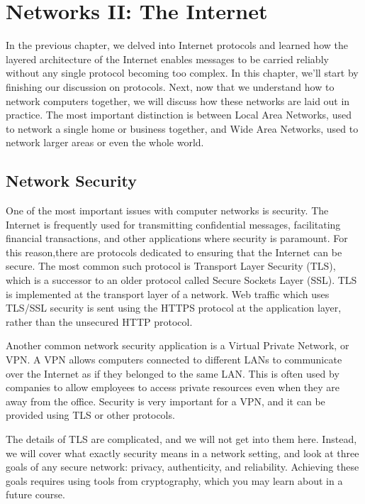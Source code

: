 \chapter{Networks II: The Internet}

In the previous chapter, we delved into Internet protocols and learned how the layered architecture of the Internet enables messages to be carried reliably without any single protocol becoming too complex. In this chapter, we'll start by finishing our discussion on protocols. Next, now that we understand how to network computers together, we will discuss how these networks are laid out in practice. The most important distinction is between Local Area Networks, used to network a single home or business together, and Wide Area Networks, used to network larger areas or even the whole world.


\section{Network Security}\label{sec:network:security}

One of the most important issues with computer networks is security. The Internet is frequently used for transmitting confidential messages, facilitating financial transactions, and other applications where security is paramount. For this reason,there are protocols dedicated to ensuring that the Internet can be secure. The most common such protocol is Transport Layer Security (TLS), which is a successor to an older protocol called Secure Sockets Layer (SSL). TLS is implemented at the transport layer of a network. Web traffic which uses TLS/SSL security is sent using the HTTPS protocol at the application layer, rather than the unsecured HTTP protocol.

Another common network security application is a Virtual Private Network, or VPN. A VPN allows computers connected to different LANs to communicate over the Internet as if they belonged to the same LAN. This is often used by companies to allow employees to access private resources even when they are away from the office. Security is very important for a VPN, and it can be provided using TLS or other protocols.

The details of TLS are complicated, and we will not get into them here. Instead, we will cover what exactly security means in a network setting, and look at three goals of any secure network: privacy, authenticity, and reliability. Achieving these goals requires using tools from cryptography, which you may learn about in a future course.

